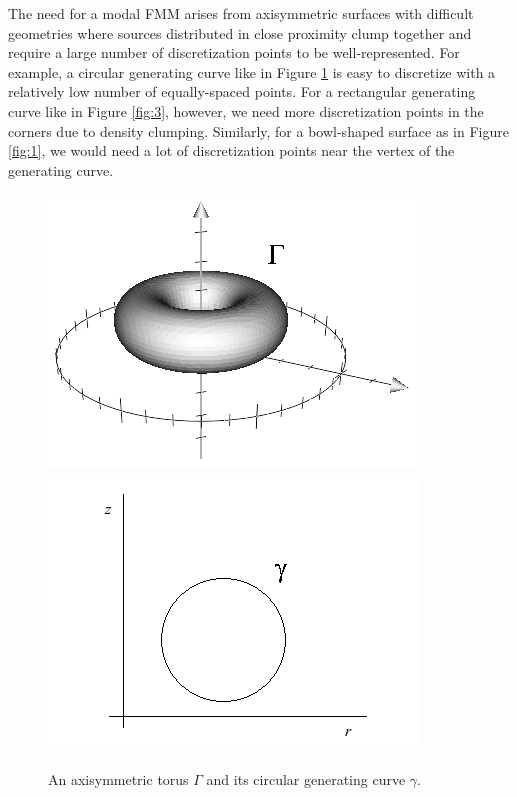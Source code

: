 \documentclass[11pt, oneside]{article}   	%
\begin{document}
The need for a modal FMM arises from axisymmetric surfaces with difficult geometries where sources distributed in close proximity clump together and require a large number of discretization points to be well-represented. For example, a circular generating curve like in Figure \ref{fig:2} is easy to discretize with a relatively low number of equally-spaced points. For a rectangular generating curve like in Figure \ref{fig:3}, however, we need more discretization points in the corners due to density clumping. Similarly, for a bowl-shaped surface as in Figure \ref{fig:1}, we would need a lot of discretization points near the vertex of the generating curve.
\begin{figure}[h]
\caption{An axisymmetric torus $\Gamma$ and its circular generating curve $\gamma$.}
\label{fig:2}
\centering
\includegraphics[scale=0.5]{torus}
\includegraphics[scale=0.5]{circle}
\end{figure}
\end{document}
